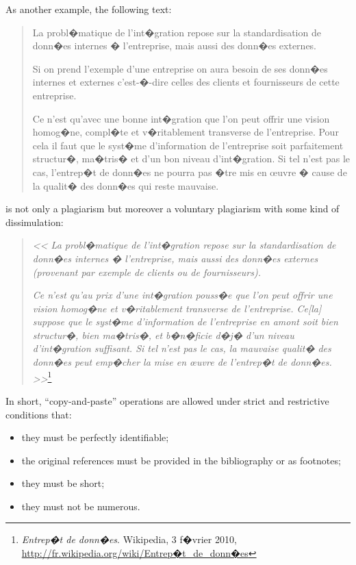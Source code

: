 As another example, the following text:
\begin{quote}
La probl�matique de l'int�gration repose sur la standardisation de donn�es internes � l'entreprise, mais aussi des donn�es externes.

Si on prend l'exemple d'une entreprise on aura besoin de ses donn�es internes et externes c'est-�-dire celles des clients et fournisseurs de cette entreprise.

Ce n'est qu'avec une bonne int�gration que l'on peut offrir une vision homog�ne, compl�te et v�ritablement transverse de l'entreprise. Pour cela il faut que le syst�me d'information de l'entreprise soit parfaitement structur�, ma�tris� et d'un bon niveau d'int�gration. Si tel n'est pas le cas, l'entrep�t de donn�es ne pourra pas �tre mis en \oe uvre � cause de la qualit� des donn�es qui reste mauvaise.
\end{quote}
is not only a plagiarism but moreover a voluntary plagiarism with some kind of dissimulation:
\begin{quote}
\emph{<< La probl�matique de l'int�gration repose sur la standardisation de donn�es internes � l'entreprise, mais aussi des donn�es externes (provenant par exemple de clients ou de fournisseurs).}

\emph{Ce n'est qu'au prix d'une int�gration pouss�e que l'on peut offrir une vision homog�ne et v�ritablement transverse de l'entreprise. Ce[la] suppose que le syst�me d'information de l'entreprise en amont soit bien structur�, bien ma�tris�, et b�n�ficie d�j� d'un niveau d'int�gration suffisant. Si tel n'est pas le cas, la mauvaise qualit� des donn�es peut emp�cher la mise en \oe uvre de l'entrep�t de donn�es. >>}\footnote{\emph{Entrep�t de donn�es}. Wikipedia, 3 f�vrier 2010, \url{http://fr.wikipedia.org/wiki/Entrep�t_de_donn�es}}
\end{quote}

\vspace{2\baselineskip}

In short, ``copy-and-paste'' operations are allowed under strict and restrictive conditions that:
\begin{itemize}
   \item they must be perfectly identifiable;
   \item the original references must be provided in the bibliography or as footnotes;
   \item they must be short;
   \item they must not be numerous.
\end{itemize}

